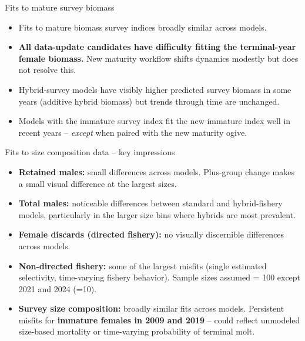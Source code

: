 \documentclass[
  10pt,
  ignorenonframetext,
  aspectratio=169,
]{beamer}
\providecommand{\tightlist}{%
  \setlength{\itemsep}{0pt}\setlength{\parskip}{0pt}}
\begin{document}
\begin{frame}{Fits to mature survey biomass}
\label{fits-to-mature-survey-biomass}
\small

\begin{itemize}
\tightlist
\item
  Fits to mature biomass survey indices broadly similar across models.
\item
  \textbf{All data-update candidates have difficulty fitting the
  terminal-year female biomass.} New maturity workflow shifts dynamics
  modestly but does not resolve this.
\item
  Hybrid-survey models have visibly higher predicted survey biomass in
  some years (additive hybrid biomass) but trends through time are
  unchanged.
\item
  Models with the immature survey index fit the new immature index well
  in recent years -- \emph{except} when paired with the new maturity
  ogive.
\end{itemize}
\end{frame}

\begin{frame}{Fits to size composition data -- key impressions}
\label{fits-to-size-composition-data-key-impressions}
\small

\begin{itemize}
\tightlist
\item
  \textbf{Retained males:} small differences across models. Plus-group
  change makes a small visual difference at the largest sizes.
\item
  \textbf{Total males:} noticeable differences between standard and
  hybrid-fishery models, particularly in the larger size bins where
  hybrids are most prevalent.
\item
  \textbf{Female discards (directed fishery):} no visually discernible
  differences across models.
\item
  \textbf{Non-directed fishery:} some of the largest misfits (single
  estimated selectivity, time-varying fishery behavior). Sample sizes
  assumed = 100 except 2021 and 2024 (=10).
\item
  \textbf{Survey size composition:} broadly similar fits across models.
  Persistent misfits for \textbf{immature females in 2009 and 2019} --
  could reflect unmodeled size-based mortality or time-varying
  probability of terminal molt.
\end{itemize}
\end{frame}
\end{document}
